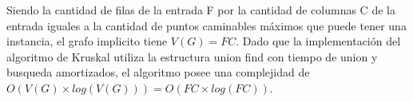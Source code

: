 Siendo la cantidad de filas de la entrada F por la cantidad de columnas C de la entrada iguales a la cantidad de puntos caminables máximos que puede tener una instancia, el grafo implicito tiene $V(G) = FC $. Dado que la implementación del algoritmo de Kruskal utiliza la estructura union find con tiempo de union y busqueda amortizados, el algoritmo posee una complejidad de $O(V(G)\times log(V(G))) = O(FC \times log(FC)) $. 